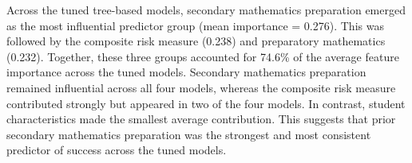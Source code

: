
Across the tuned tree-based models, secondary mathematics preparation emerged as the most influential predictor group (mean importance = 0.276). This was followed by the composite risk measure (0.238) and preparatory mathematics (0.232). Together, these three groups accounted for 74.6\% of the average feature importance across the tuned models. Secondary mathematics preparation remained influential across all four models, whereas the composite risk measure contributed strongly but appeared in two of the four models. In contrast, student characteristics made the smallest average contribution. This suggests that prior secondary mathematics preparation was the strongest and most consistent predictor of success across the tuned models.
